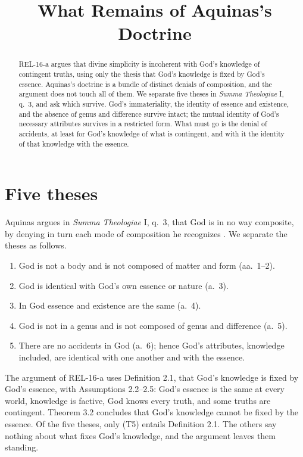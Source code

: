 \documentclass{situationist-preprint}
\title{What Remains of Aquinas's Doctrine}
\begin{document}
\maketitle

\begin{abstract}
REL-16-a argues that divine simplicity is incoherent with God's knowledge of contingent truths, using only the thesis that God's knowledge is fixed by God's essence. Aquinas's doctrine is a bundle of distinct denials of composition, and the argument does not touch all of them. We separate five theses in \emph{Summa Theologiae} I, q.~3, and ask which survive. God's immateriality, the identity of essence and existence, and the absence of genus and difference survive intact; the mutual identity of God's necessary attributes survives in a restricted form. What must go is the denial of accidents, at least for God's knowledge of what is contingent, and with it the identity of that knowledge with the essence.
\end{abstract}

\section{Five theses}

Aquinas argues in \emph{Summa Theologiae} I, q.~3, that God is in no way composite, by denying in turn each mode of composition he recognizes \citep{AquinasST}. We separate the theses as follows.
\begin{enumerate}
\item[(T1)] God is not a body and is not composed of matter and form (aa.~1--2).
\item[(T2)] God is identical with God's own essence or nature (a.~3).
\item[(T3)] In God essence and existence are the same (a.~4).
\item[(T4)] God is not in a genus and is not composed of genus and difference (a.~5).
\item[(T5)] There are no accidents in God (a.~6); hence God's attributes, knowledge included, are identical with one another and with the essence.
\end{enumerate}
The argument of REL-16-a uses Definition 2.1, that God's knowledge is fixed by God's essence, with Assumptions 2.2--2.5: God's essence is the same at every world, knowledge is factive, God knows every truth, and some truths are contingent. Theorem 3.2 concludes that God's knowledge cannot be fixed by the essence. Of the five theses, only (T5) entails Definition 2.1. The others say nothing about what fixes God's knowledge, and the argument leaves them standing.
\end{document}
